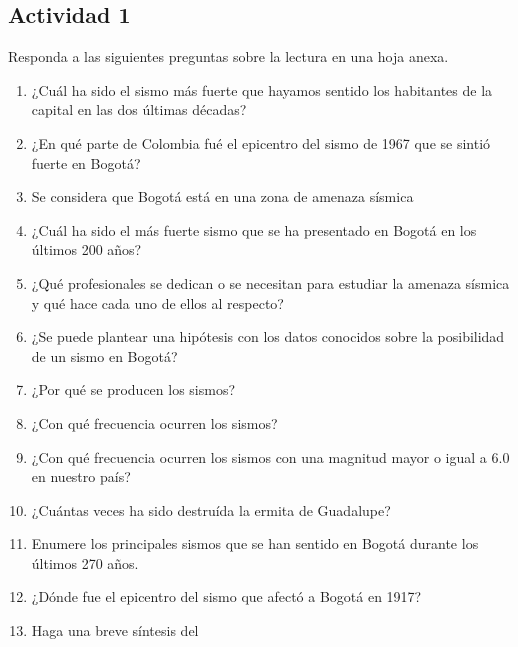 \documentclass[10pt,twoside]{article}
\begin{document}
\begin{multicols}{2}
\section*{Actividad 1}
Responda a las siguientes preguntas sobre la lectura en una hoja anexa.
\begin{enumerate}
\item ¿Cuál ha sido el sismo más fuerte que hayamos sentido los habitantes de la capital en las dos últimas décadas?
\item ¿En qué parte de Colombia fué el epicentro del sismo de 1967 que se sintió fuerte en Bogotá?
\item Se considera que Bogotá está en una zona de amenaza sísmica
\begin{enumerate}
\end{enumerate}
\item ¿Cuál ha sido el más fuerte sismo que se ha presentado en Bogotá en los últimos 200 años?
\item ¿Qué profesionales se dedican o se necesitan para estudiar la amenaza sísmica y qué hace cada uno de ellos al respecto?
\item ¿Se puede plantear una hipótesis con los datos conocidos sobre la posibilidad de un sismo en Bogotá?
\item ¿Por qué se producen los sismos?
\item ¿Con qué frecuencia ocurren los sismos?
\item ¿Con qué frecuencia ocurren los sismos con una magnitud mayor o igual a 6.0 en nuestro país?
\item ¿Cuántas veces ha sido destruída la ermita de Guadalupe?
\item Enumere los principales sismos que se han sentido  en Bogotá durante los últimos 270 años.
\item ¿Dónde fue el epicentro del sismo que afectó a Bogotá en 1917?
\item Haga una breve síntesis del
\end{enumerate}

\end{multicols}
\end{document}
